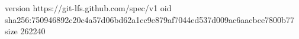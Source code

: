 version https://git-lfs.github.com/spec/v1
oid sha256:750946892c20c4a57d06bd62a1cc9e879af7044ed537d009ac6aacbce7800b77
size 262240
